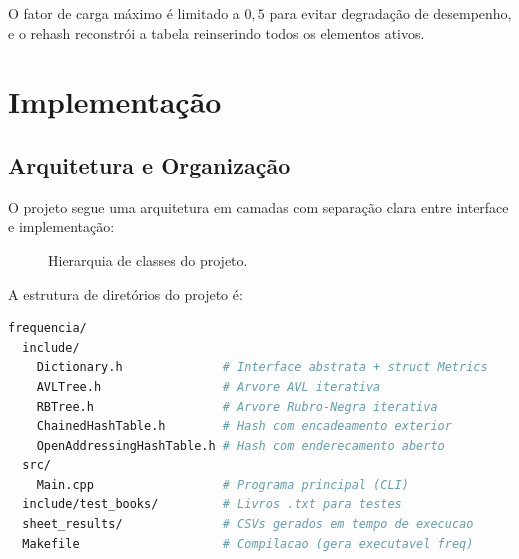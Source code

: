 \documentclass[12pt, a4paper]{article}
\begin{document}
O fator de carga máximo é limitado a $0{,}5$ para evitar degradação de desempenho,
e o rehash reconstrói a tabela reinserindo todos os elementos ativos.

\section{Implementação}

\subsection{Arquitetura e Organização}

O projeto segue uma arquitetura em camadas com separação clara entre interface e
implementação:

\begin{figure}[H]
\centering
{}
\caption{Hierarquia de classes do projeto.}
\label{fig:hierarquia}
\end{figure}

A estrutura de diretórios do projeto é:

\begin{lstlisting}[language=bash, style=cppstyle, caption={Estrutura de diretórios.}]
frequencia/
  include/
    Dictionary.h              # Interface abstrata + struct Metrics
    AVLTree.h                 # Arvore AVL iterativa
    RBTree.h                  # Arvore Rubro-Negra iterativa
    ChainedHashTable.h        # Hash com encadeamento exterior
    OpenAddressingHashTable.h # Hash com enderecamento aberto
  src/
    Main.cpp                  # Programa principal (CLI)
  include/test_books/         # Livros .txt para testes
  sheet_results/              # CSVs gerados em tempo de execucao
  Makefile                    # Compilacao (gera executavel freq)
\end{lstlisting}
\end{document}
